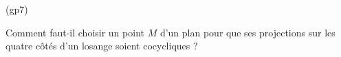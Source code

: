 \begin{tiny}(gp7)\end{tiny}
Comment faut-il choisir un point $M$ d'un plan pour que ses
projections sur les quatre c{\^o}t{\'e}s d'un losange soient
cocycliques ?